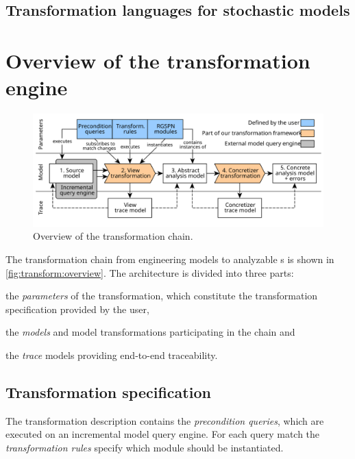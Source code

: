 \todo*{}

\subsection{Transformation languages for stochastic models}

\todo*{}

\section{Overview of the transformation engine}
\label{chap:transfrom:specify}

\begin{figure}
  \centering
  \includegraphics[scale=0.9]{figures/transformation_chain}
  \caption{Overview of the transformation chain.}
  \label{fig:transform:overview}
\end{figure}

The transformation chain from engineering models to analyzable s is shown in \vref{fig:transform:overview}. The architecture is divided into three parts: \begin{inparaenum}
\item the \emph{parameters} of the transformation, which constitute the transformation specification provided by the user,
\item the \emph{models} and model transformations participating in the chain and
\item the \emph{trace} models providing end-to-end traceability.
\end{inparaenum}

\subsection{Transformation specification}

The transformation description contains the \emph{precondition queries}, which are executed on an incremental model query engine. For each query match the \emph{transformation rules} specify which \emph{} module should be instantiated.

